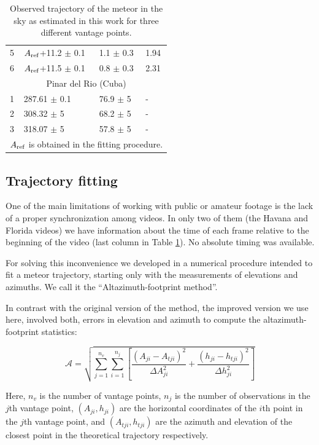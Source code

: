 \documentclass[fleqn,usenatbib]{mnras}
\newcommand{\beq}{\begin{equation}}
\newcommand{\eeq}{\end{equation}}
\begin{document}
\begin{table}
\begin{tabular}{llll}
5 & $A_{\rm ref}$+11.2 $\pm$ 0.1 & 1.1 $\pm$ 0.3 & 1.94 \\
6 & $A_{\rm ref}$+11.5 $\pm$ 0.1 & 0.8 $\pm$ 0.3 & 2.31 \\
\hline\multicolumn{4}{c}{Pinar del Rio (Cuba)}\\\hline
1 & 287.61 $\pm$ 0.1 & 76.9 $\pm$ 5 & - \\
2 & 308.32 $\pm$ 5 & 68.2 $\pm$ 5 & - \\
3 & 318.07 $\pm$ 5 & 57.8 $\pm$ 5 & - \\
\hline\hline
\multicolumn{4}{l}{\footnotesize*$A_{\rm ref}$ is obtained in the fitting procedure.}\\
\end{tabular}
\caption{Observed trajectory of the meteor in the sky as estimated in this work for three different vantage points.\label{tab:measurements}}
\end{table}

\subsection{Trajectory fitting}
\label{sec:fit}

One of the main limitations of working with public or amateur footage is the lack of a proper synchronization among videos. In only two of them (the Havana and Florida videos) we have information about the time of each frame relative to the beginning of the video (last column in Table \ref{tab:measurements}).  No absolute timing was available.  

For solving this inconvenience we developed in \citet{Zuluaga2013} a numerical procedure intended to fit a meteor trajectory, starting only with the measurements of elevations and azimuths. We call it the ``Altazimuth-footprint method''. 

In contrast with the original version of the method, the improved version we use here, involved both, errors in elevation and azimuth to compute the altazimuth-footprint statistics:

\beq
\label{eq:altaz}
\mathcal{A}=\sqrt{
\sum_{j=1}^{n_v}\sum_{i=1}^{n_j} 
\left[
\frac{(A_{ji}-A_{tji})^2}{\Delta A_{ji}^2}+
\frac{(h_{ji}-h_{tji})^2}{\Delta h_{ji}^2}
\right]
}
\eeq

Here, $n_v$ is the number of vantage points, $n_j$ is the number of observations in the $j$th vantage point, $(A_{ji},h_{ji})$ are the horizontal coordinates of the $i$th point in the $j$th vantage point, and $(A_{tji},h_{tji})$ are the azimuth and elevation of the closest point in the theoretical trajectory respectively.
\end{document}
